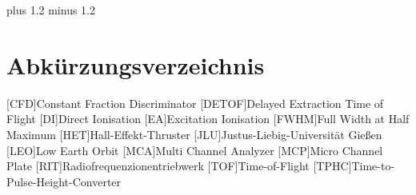 \documentclass[fontsize=11pt,%
twoside,
BCOR          = 8mm]{scrreprt}
\author{Lorenz Saalmann}
\begin{document}
\font plus 1.2\font
minus 1.2\font






\cleardoublepage

\tableofcontents
\cleardoublepage

\listoffigures
\clearpage
\listoftables
\clearpage
\section*{\Large Abkürzungsverzeichnis}
\begin{acronym}
  [CFD]{\dotfill Constant Fraction Discriminator}  
  [DETOF]{\dotfill Delayed Extraction Time of Flight}
  [DI]{\dotfill Direct Ionisation}  
  [EA]{\dotfill Excitation Ionisation}  
  [FWHM]{\dotfill Full Width at Half Maximum}  
  [HET]{\dotfill Hall-Effekt-Thruster}  
  [JLU]{\dotfill Justus-Liebig-Universit\"{a}t Gie{\ss}en}  
  [LEO]{\dotfill Low Earth Orbit}  
  [MCA]{\dotfill Multi Channel Analyzer}  
  [MCP]{\dotfill Micro Channel Plate}  
  [RIT]{\dotfill Radiofrequenzionentriebwerk}  
  [TOF]{\dotfill Time-of-Flight}  
  [TPHC]{\dotfill Time-to-Pulse-Height-Converter}  


\end{acronym}
\cleardoublepage

\onehalfspacing

\cleardoublepage


\cleardoublepage

\cleardoublepage

\cleardoublepage

\cleardoublepage

\cleardoublepage
\renewcommand\bibname{Literaturverzeichnis}
{}
\printbibliography
\cleardoublepage


\fontsize{12pt}{12pt}\selectfont
\end{document}

